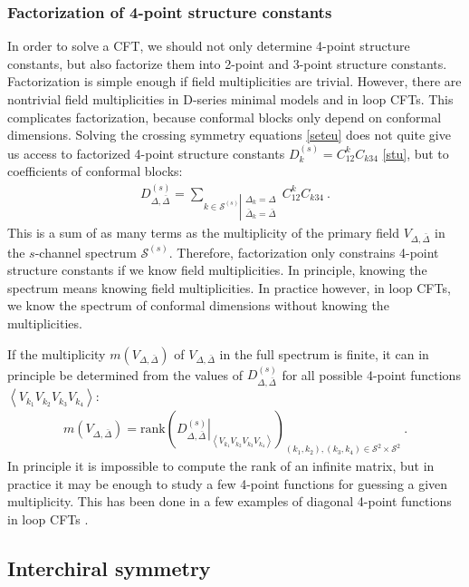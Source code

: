 \documentclass[12pt, a4paper]{article}
\begin{document}
\subsubsection{Factorization of 4-point structure constants}\label{sec:factor}

In order to solve a CFT, we should not only determine 4-point structure constants, but also factorize them into 2-point and 3-point structure constants. Factorization is simple enough if field multiplicities are trivial. However, there are nontrivial field multiplicities in D-series minimal models and in loop CFTs. 
This complicates factorization, because conformal blocks only depend on conformal dimensions. Solving the crossing symmetry equations \eqref{seteu} does not quite give us access to factorized 4-point structure constants $D^{(s)}_k = C^k_{12}C_{k34}$ \eqref{stu}, but to coefficients of conformal blocks:
\begin{align}
 D^{(s)}_{\Delta,\bar\Delta} = \sum_{k\in\mathcal{S}^{(s)}\left|\substack{\Delta_k=\Delta\\ \bar{\Delta}_k=\bar\Delta}\right.} C^k_{12}C_{k34} \ .
 \label{dcc}
\end{align}
This is a sum of as many terms as the multiplicity of the primary field $V_{\Delta,\bar\Delta}$ in the $s$-channel spectrum $\mathcal{S}^{(s)}$. Therefore, factorization only constrains 4-point structure constants if we know field multiplicities. In principle, knowing the spectrum means knowing field multiplicities. In practice however, in loop CFTs, we know the spectrum of conformal dimensions without knowing the multiplicities. 

If the multiplicity $m(V_{\Delta,\bar\Delta})$ of $V_{\Delta,\bar\Delta}$ in the full spectrum is finite, it can in principle be determined from the values of $D^{(s)}_{\Delta,\bar\Delta}$ for all possible 4-point functions $\left<V_{k_1}V_{k_2}V_{k_3}V_{k_4}\right>$: 
\begin{align}
 m\left(V_{\Delta,\bar\Delta}\right) = \text{rank}\left(\left.D^{(s)}_{\Delta,\bar\Delta}\right|_{\left<V_{k_1}V_{k_2}V_{k_3}V_{k_4}\right>}\right)_{(k_1,k_2),(k_3,k_4)\in\mathcal{S}^2\times \mathcal{S}^2}\ .
\end{align}
In principle it is impossible to compute the rank of an infinite matrix, but 
in practice it may be enough to study a few 4-point functions for guessing a given multiplicity. This has been done in a few examples of diagonal 4-point functions in loop CFTs \cite{rib22}.

\subsection{Interchiral symmetry} \label{sec:icb}
\end{document}
